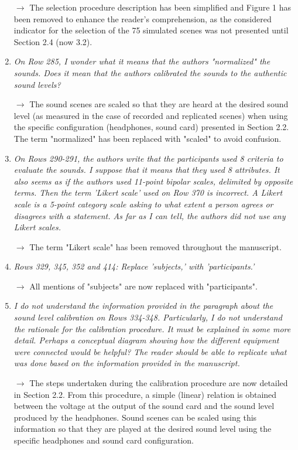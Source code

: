 \documentclass[10pt]{article}
\begin{document}
\begin{enumerate}
$\rightarrow$ The selection procedure description has been simplified and Figure 1 has been removed to enhance the reader's comprehension, as the considered indicator for the selection of the 75 simulated scenes was not presented until Section 2.4 (now 3.2).

\item \emph{On Row 285, I wonder what it means that the authors "normalized" the sounds. Does it mean that the authors calibrated the sounds to the authentic sound levels?}

$\rightarrow$ The sound scenes are scaled so that they are heard at the desired sound level (as measured in the case of recorded and replicated scenes) when using the specific configuration (headphones, sound card) presented in Section 2.2. The term "normalized" has been replaced with "scaled" to avoid confusion.

\item \emph{On Rows 290-291, the authors write that the participants used 8 criteria to evaluate the sounds. I suppose that it means that they used 8 attributes. It also seems as if the authors used 11-point bipolar scales, delimited by opposite terms. Then the term 'Likert scale' used on Row 370 is incorrect. A Likert scale is a 5-point category scale asking to what extent a person agrees or disagrees with a statement. As far as I can tell, the authors did not use any Likert scales.}

$\rightarrow$ The term "Likert scale" has been removed throughout the manuscript.

\item \emph{Rows 329, 345, 352 and 414: Replace 'subjects,' with 'participants.'}

$\rightarrow$ All mentions of "subjects" are now replaced with "participants".

\item \emph{I do not understand the information provided in the paragraph about the sound level calibration on Rows 334-348. Particularly, I do not understand the rationale for the calibration procedure. It must be explained in some more detail. Perhaps a conceptual diagram showing how the different equipment were connected would be helpful? The reader should be able to replicate what was done based on the information provided in the manuscript.}

$\rightarrow$ The steps undertaken during the calibration procedure are now detailed in Section 2.2. From this procedure, a simple (linear) relation is obtained between the voltage at the output of the sound card and the sound level produced by the headphones. Sound scenes can be scaled using this information so that they are played at the desired sound level using the specific headphones and sound card configuration.


\end{enumerate}
\end{document}
